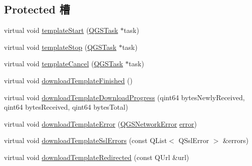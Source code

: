 \subsection*{Protected 槽}
\begin{DoxyCompactItemize}
\item 
virtual void \mbox{\hyperlink{class_q_g_s_download_task_a0251421d3df72924778f0ca79215b256}{template\+Start}} (\mbox{\hyperlink{class_q_g_s_task}{Q\+G\+S\+Task}} $\ast$task)
\item 
virtual void \mbox{\hyperlink{class_q_g_s_download_task_ab199815aec85f4a2bfd0e2425db13c50}{template\+Stop}} (\mbox{\hyperlink{class_q_g_s_task}{Q\+G\+S\+Task}} $\ast$task)
\item 
virtual void \mbox{\hyperlink{class_q_g_s_download_task_ae9656beb3a4c96b35a15c928f8cbd095}{template\+Cancel}} (\mbox{\hyperlink{class_q_g_s_task}{Q\+G\+S\+Task}} $\ast$task)
\item 
virtual void \mbox{\hyperlink{class_q_g_s_download_task_aee1b0d081261d0bb58afd6f461d1e742}{download\+Template\+Finished}} ()
\item 
virtual void \mbox{\hyperlink{class_q_g_s_download_task_adf2fb34e9db864af10cb0f2c1947f8f7}{download\+Template\+Download\+Progress}} (qint64 bytes\+Newly\+Received, qint64 bytes\+Received, qint64 bytes\+Total)
\item 
virtual void \mbox{\hyperlink{class_q_g_s_download_task_acbf14e1a08aa04dbe793e43043d47cae}{download\+Template\+Error}} (\mbox{\hyperlink{class_q_g_s_network_error}{Q\+G\+S\+Network\+Error}} \mbox{\hyperlink{class_q_g_s_task_a0ac4592b48e8de87af4f92c4a98a1763}{error}})
\item 
virtual void \mbox{\hyperlink{class_q_g_s_download_task_a9c3c51f1db9d8af61a664b2161bdb3a3}{download\+Template\+Ssl\+Errors}} (const Q\+List$<$ Q\+Ssl\+Error $>$ \&errors)
\item 
virtual void \mbox{\hyperlink{class_q_g_s_download_task_a4264ed10615e7477927b5a03aff2fb63}{download\+Template\+Redirected}} (const Q\+Url \&url)
\end{DoxyCompactItemize}
